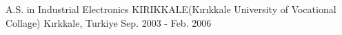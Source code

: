 

\begin{cventries}

  \cventry
    {A.S. in Industrial Electronics} %
    {KIRIKKALE(Kırıkkale University of Vocational Collage)} %
    {Kırkkale, Turkiye} %
    {Sep. 2003 - Feb. 2006} %
\end{cventries}
